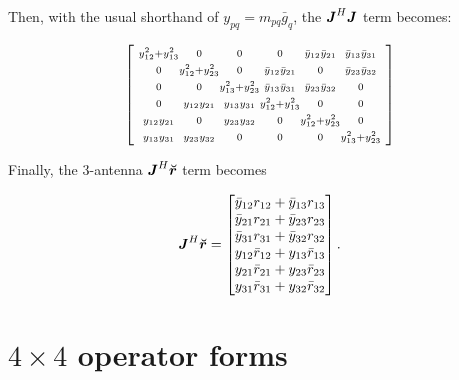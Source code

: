 \documentclass[useAMS,usenatbib]{mn2e}
\makeatletter
\newcommand{\mat}[1]{{\bmath{#1}}}
\newcommand{\JJ}{\mat{J}} %
\newcommand{\Matrix}[2]{\left [ \begin{array}{@{}#1@{}}#2\end{array} \right ]}
\newcommand{\AUG}[1]{\bmath{\breve{#1}}}
\newcommand{\Rr}{\AUG{r}}
\numberwithin{equation}{section} %
\makeatother
\begin{document}
Then, with the usual shorthand of $y_{pq} = m_{pq} \bar{g}_q$, the
$\JJ^H\JJ$ term becomes:

\begin{equation}
\label{eq:JHJ:3ant}
\Matrix{@{~}c@{}c@{}c@{}c@{}c@{}c@{~}}{
\scriptstyle\yysq{12}{13} &\scriptstyle 0             &\scriptstyle 0             &\scriptstyle 0             &\scriptstyle \bb{1}{2}       &\scriptstyle \bb{1}{3} \\
\scriptstyle0             &\scriptstyle \yysq{12}{23} &\scriptstyle 0             &\scriptstyle \bb{1}{2}       &\scriptstyle 0             &\scriptstyle \bb{2}{3} \\
\scriptstyle0             &\scriptstyle 0             &\scriptstyle \yysq{13}{23} &\scriptstyle \bb{1}{3}       &\scriptstyle \bb{2}{3}       &\scriptstyle 0       \\
\scriptstyle0             &\scriptstyle \bbb{1}{2}      &\scriptstyle \bbb{1}{3}      &\scriptstyle \yysq{12}{13} &\scriptstyle 0             &\scriptstyle 0       \\ 
\scriptstyle\bbb{1}{2}      &\scriptstyle 0             &\scriptstyle \bbb{2}{3}      &\scriptstyle 0             &\scriptstyle \yysq{12}{23} &\scriptstyle 0 \\
\scriptstyle\bbb{1}{3}      &\scriptstyle \bbb{2}{3}      &\scriptstyle 0             &\scriptstyle 0             &\scriptstyle 0             &\scriptstyle  \yysq{13}{23} \\
}
\end{equation}

Finally, the 3-antenna $\JJ^H\Rr$ term becomes

\begin{equation}
\label{eq:JHR:3ant}
\JJ^H\Rr = \Matrix{c}{
\bar{y}_{12} r_{12} + \bar{y}_{13} r_{13} \\
\bar{y}_{21} r_{21} + \bar{y}_{23} r_{23} \\
\bar{y}_{31} r_{31} + \bar{y}_{32} r_{32} \\
y_{12} \bar{r}_{12} + y_{13} \bar{r}_{13}   \\
y_{21} \bar{r}_{21} + y_{23} \bar{r}_{23}   \\
y_{31} \bar{r}_{31} + y_{32} \bar{r}_{32}   \\
}.
\end{equation}

\section{$4\times4$ operator forms}
\label{app:4x4}
\end{document}
